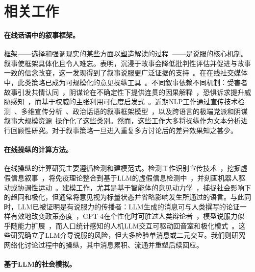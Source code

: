 \section{相关工作}

\paragraph{在线话语中的叙事框架。}

框架——选择和强调现实的某些方面以塑造解读的过程~\citep{Entman1993}——是说服的核心机制。叙事使框架具体化且令人难忘。\citet{Green2000}表明，沉浸于故事会降低批判性评估并促进与故事一致的信念改变，这一发现得到了叙事说服更广泛证据的支持~\citep{Shen2015}。在在线社交媒体中，此类策略已成为可规模化的意见操纵工具~\citep{Tucker2018,Wardle2017}。不同叙事依赖不同机制：受害者故事引发共情认同~\citep{Green2000}，阴谋论在不确定性下提供连贯的因果解释~\citep{Douglas2017}，恐惧诉求提升威胁感知~\citep{Witte1992}，而基于权威的主张利用可信度启发式~\citep{Cialdini2001}。近期NLP工作通过宣传技术检测~\citep{DaSanMartino2019}、多维宣传分析~\citep{liu-etal-2025-propainsight}、政治话语的叙事框架模型~\citep{otmakhova-frermann-2025-narrative}，以及跨语言的极端党派和阴谋叙事大规模资源~\citep{maggini-etal-2026-partisanlens}操作化了这些类别。然而，这些工作大多将操纵作为文本分析进行回顾性研究。对于叙事策略一旦进入重复多方讨论后的差异效果知之甚少。

\paragraph{在线操纵的计算方法。}

在线操纵的计算研究主要遵循检测和建模范式。检测工作识别宣传技术~\citep{DaSanMartino2019}，挖掘虚假信息叙事~\citep{sosnowski-etal-2025-dinam}，将免疫理论整合到基于LLM的虚假信息检测中~\citep{modzelewski-etal-2026-malicious}，并刻画机器人驱动或协调性运动~\citep{Ferrara2016,Woolley2018}。建模工作，尤其是基于智能体的意见动力学~\citep{Deffuant2000,Flache2017}，捕捉社会影响下的趋同和极化，但通常将意见视为标量状态并省略影响发生所通过的语言。与此同时，LLM已被证明是有说服力的传播者：LLM生成的消息可与人类撰写的论证一样有效地改变政策态度~\citep{Bai2025}，GPT-4在个性化时可胜过人类辩论者~\citep{Salvi2025}，模型说服力似乎随能力扩展~\citep{Durmus2024,pauli-etal-2025-measuring}，而人口统计感知的人机LLM交互可驱动回音室和极化模式~\citep{borah-etal-2026-persuasion}。这些研究确立了LLM介导说服的风险，但大多检验单消息或二元交互。我们则研究网络化讨论过程中的操纵，其中消息累积、流通并重塑后续回应。

\paragraph{基于LLM的社会模拟。}


